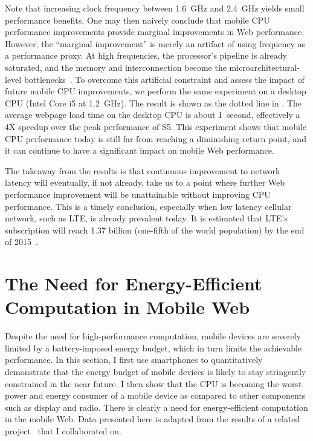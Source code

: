 Note that increasing clock frequency between 1.6~GHz and 2.4~GHz yields small performance benefits. One may then naively conclude that mobile CPU performance improvements provide marginal improvements in Web performance. However, the ``marginal improvement'' is merely an artifact of using frequency as a performance proxy. At high frequencies, the processor's pipeline is already saturated, and the memory and interconnection become the microarchitectural-level bottlenecks~\cite{clockvsipc}. To overcome this artificial constraint and assess the impact of future mobile CPU improvements, we perform the same experiment on a desktop CPU (Intel Core i5 at 1.2~GHz). The result is shown as the dotted line in . The average webpage load time on the desktop CPU is about 1~second, effectively a 4X speedup over the peak performance of S5. This experiment shows that mobile CPU performance today is still far from reaching a diminishing return point, and it can continue to have a significant impact on mobile Web performance.

The takeaway from the results is that continuous improvement to network latency will eventually, if not already, take us to a point where further Web performance improvement will be unattainable without improving CPU performance.  This is a timely conclusion, especially when low latency cellular network, such as LTE, is already prevalent today. It is estimated that LTE's subscription will reach 1.37 billion (one-fifth of the world population) by the end of 2015~\cite{lte_subscription}.

\section{The Need for Energy-Efficient Computation in Mobile Web}
\label{sec:motivation:energy}

Despite the need for high-performance computation, mobile devices are severely limited by a battery-imposed energy budget, which in turn limits the achievable performance. In this section, I first use smartphones to quantitatively demonstrate that the energy budget of mobile devices is likely to stay stringently constrained in the near future. I then show that the CPU is becoming the worst power and energy consumer of a mobile device as compared to other components such as display and radio. There is clearly a need for energy-efficient computation in the mobile Web. Data presented here is adapted from the results of a related project~\cite{mobilecpu} that I collaborated on.

